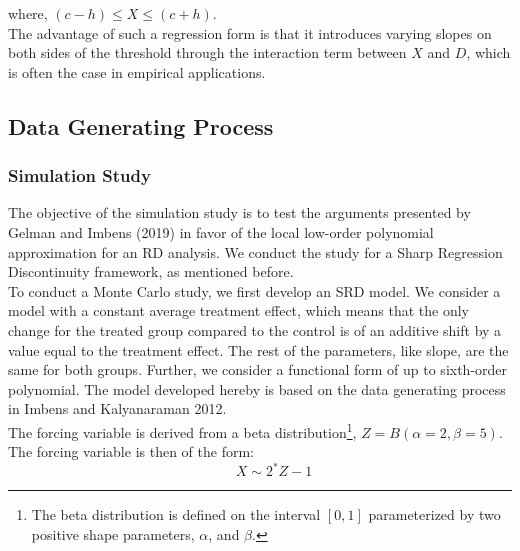 \documentclass[fleqn]{article}
\begin{document}
    where, $(c-h)\leq X \leq (c+h)$.\\

    The advantage of such a regression form is that it introduces varying slopes on both sides of the threshold through the interaction term between $X$ and $D$, which is often the case in empirical applications.\\

    \subsection{Data Generating Process}
    \label{subsec:data generating process}

    \subsubsection{Simulation Study}
    \label{subsubsec: simulation study}

    The objective of the simulation study is to test the arguments presented by Gelman and Imbens (2019)\cite{gelman2019high} in favor of the local low-order polynomial approximation for an RD analysis. We conduct the study for a Sharp Regression Discontinuity framework, as mentioned before.\\

    To conduct a Monte Carlo study, we first develop an SRD model. We consider a model with a constant average treatment effect, which means that the only change for the treated group compared to the control is of an additive shift  by a value equal to the treatment effect. The rest of the parameters, like slope, are the same for both groups. Further, we consider a functional form of up to sixth-order polynomial. The model developed hereby is based on the data generating process in Imbens and Kalyanaraman 2012\cite{imbens2012optimal}.\\

    The forcing variable is derived from a beta distribution\footnote{The beta distribution is defined on the interval $\left[0,1\right]$ parameterized by two positive shape parameters, $\alpha$, and $\beta$.}, $Z = B(\alpha = 2, \beta = 5)$. The forcing variable is then of the form:\\
    \begin{equation*}
        \qquad X \sim 2^{*}Z - 1
    \end{equation*}
\end{document}
